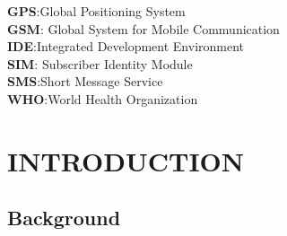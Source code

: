 \documentclass[12pt,a4paper]{report}
\begin{document}
	\begin{justify}
\textbf{GPS}:\hspace{0.5 cm}Global Positioning System\\
\textbf{GSM}:\hspace{0.3 cm} Global System for Mobile Communication\\
\textbf{IDE}:\hspace{0.6 cm}Integrated Development Environment\\
\textbf{SIM}:\hspace{0.5 cm} Subscriber Identity Module\\
\textbf{SMS}:\hspace{0.5 cm}Short Message Service\\
\textbf{WHO}:\hspace{0.3 cm}World Health Organization
	\end{justify}
	
	
	
	
	
	
	
	
	
	

 	\chapter {INTRODUCTION}
	
	\section{Background}
	
\end{document}
